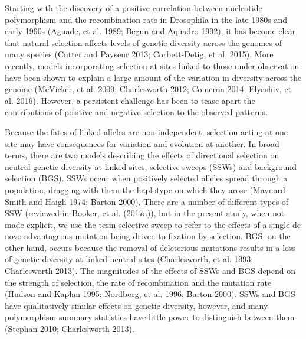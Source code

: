 Starting with the discovery of a positive correlation between nucleotide polymorphism and the recombination rate in Drosophila in the late 1980s and early 1990s (Aguade, et al. 1989; Begun and Aquadro 1992), it has become clear that natural selection affects levels of genetic diversity across the genomes of many species (Cutter and Payseur 2013; Corbett-Detig, et al. 2015). More recently, models incorporating selection at sites linked to those under observation have been shown to explain a large amount of the variation in diversity across the genome (McVicker, et al. 2009; Charlesworth 2012; Comeron 2014; Elyashiv, et al. 2016). However, a persistent challenge has been to tease apart the contributions of positive and negative selection to the observed patterns.

Because the fates of linked alleles are non-independent, selection acting at one site may have consequences for variation and evolution at another. In broad terms, there are two models describing the effects of directional selection on neutral genetic diversity at linked sites, selective sweeps (SSWs) and background selection (BGS). SSWs occur when positively selected alleles spread through a population, dragging with them the haplotype on which they arose (Maynard Smith and Haigh 1974; Barton 2000). There are a number of different types of SSW (reviewed in Booker, et al. (2017a)), but in the present study, when not made explicit, we use the term selective sweep to refer to the effects of a single de novo advantageous mutation being driven to fixation by selection. BGS, on the other hand, occurs because the removal of deleterious mutations results in a loss of genetic diversity at linked neutral sites (Charlesworth, et al. 1993; Charlesworth 2013). The magnitudes of the effects of SSWs and BGS depend on the strength of selection, the rate of recombination and the mutation rate (Hudson and Kaplan 1995; Nordborg, et al. 1996; Barton 2000). SSWs and BGS have qualitatively similar effects on genetic diversity, however, and many polymorphism summary statistics have little power to distinguish between them (Stephan 2010; Charlesworth 2013). 

